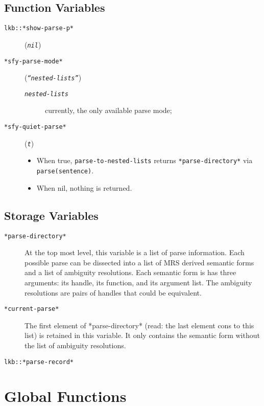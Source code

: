 \documentclass{article}
\newcommand{\com}[1]{\texttt{#1}}
\newcommand{\var}[1]{\texttt{#1}}
\newcommand{\val}[1]{\texttt{\textsl{#1}}}
\begin{document}
\subsection{Function Variables}

  \begin{description}
    \item[\var{lkb::*show-parse-p*}] (\val{nil})
    \item[\var{*sfy-parse-mode*}] (\val{``nested-lists''})
      \begin{description}
        \item[\val{nested-lists}] currently, the only available parse mode;
      \end{description}
    \item[\var{*sfy-quiet-parse*}] (\val{t})
      \begin{itemize}
        \item When true, \com{parse-to-nested-lists} returns \var{*parse-directory*} via \com{parse(\var{sentence})}.
        \item When nil, nothing is returned.
      \end{itemize}
  \end{description}

\subsection{Storage Variables}

  \begin{description}
    \item[\var{*parse-directory*}] At the top most level, this variable is a list of parse information. Each possible parse can be dissected into a list of MRS derived semantic forms and a list of ambiguity resolutions. Each semantic form is has three arguments: its handle, its function, and its argument list. The ambiguity resolutions are pairs of handles that could be equivalent.
    \item[\var{*current-parse*}] The first element of *parse-directory* (read:  the last element cons to this list) is retained in this variable.  It only contains the semantic form without the list of ambiguity resolutions.
    \item[\var{lkb::*parse-record*}]
  \end{description}

\section{Global Functions}
\end{document}
